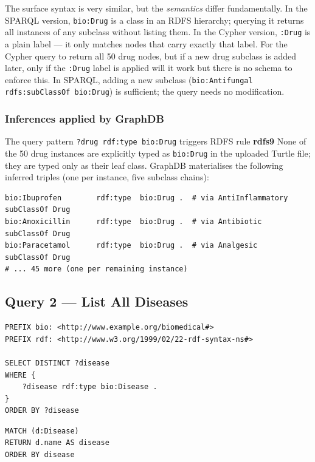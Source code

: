 \documentclass[11pt,a4paper]{article}
\begin{document}
The surface syntax is very similar, but the \emph{semantics} differ
fundamentally.  In the SPARQL version, \texttt{bio:Drug} is a class in an RDFS
hierarchy; querying it returns all instances of any subclass without listing
them.  In the Cypher version, \texttt{:Drug} is a plain label — it only
matches nodes that carry exactly that label.  For the Cypher query to return
all 50 drug nodes, but if a new
drug subclass is added later, only if the \texttt{:Drug} label is applied will it work but there is no
schema to enforce this.  In SPARQL, adding a new subclass
(\texttt{bio:Antifungal rdfs:subClassOf bio:Drug}) is sufficient; the query
needs no modification.

\subsubsection*{Inferences applied by GraphDB}

The query pattern \texttt{?drug rdf:type bio:Drug} triggers RDFS rule \textbf{rdfs9}
None of the 50 drug instances are explicitly typed as \texttt{bio:Drug} in the
uploaded Turtle file; they are typed only as their leaf class.  GraphDB
materialises the following inferred triples (one per instance, five subclass
chains):

\begin{lstlisting}[style=turtle]
bio:Ibuprofen        rdf:type  bio:Drug .  # via AntiInflammatory subClassOf Drug
bio:Amoxicillin      rdf:type  bio:Drug .  # via Antibiotic       subClassOf Drug
bio:Paracetamol      rdf:type  bio:Drug .  # via Analgesic        subClassOf Drug
# ... 45 more (one per remaining instance)
\end{lstlisting}


\subsection{Query 2 — List All Diseases}

\begin{lstlisting}[style=sparql, caption={SPARQL: list all diseases.}]
PREFIX bio: <http://www.example.org/biomedical#>
PREFIX rdf: <http://www.w3.org/1999/02/22-rdf-syntax-ns#>

SELECT DISTINCT ?disease
WHERE {
    ?disease rdf:type bio:Disease .
}
ORDER BY ?disease
\end{lstlisting}

\begin{lstlisting}[style=cypher, caption={Cypher equivalent: list all diseases.}]
MATCH (d:Disease)
RETURN d.name AS disease
ORDER BY disease
\end{lstlisting}
\end{document}
